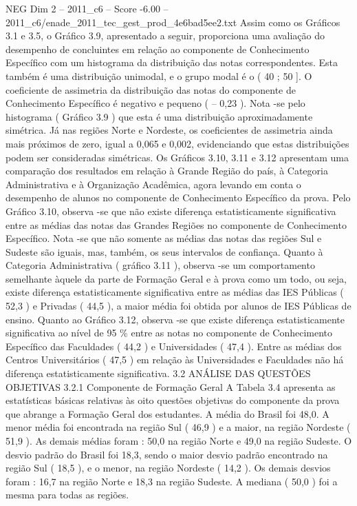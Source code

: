 \begin{textsample}{NEG Dim 2 – 2011\_c6 – Score -6.00 – 2011\_c6/enade\_2011\_tec\_gest\_prod\_4e6bad5ee2.txt}
Assim como os Gráficos 3.1 e 3.5, o Gráfico 3.9, apresentado a seguir, proporciona uma avaliação do desempenho de concluintes em relação ao componente de Conhecimento Específico com um histograma da distribuição das notas correspondentes.
Esta também é uma distribuição unimodal, e o grupo modal é o ( 40 ; 50 ].
O coeficiente de assimetria da distribuição das notas do componente de Conhecimento Específico é negativo e pequeno ( – 0,23 ).
Nota -se pelo histograma ( Gráfico 3.9 ) que esta é uma distribuição aproximadamente simétrica.
Já nas regiões Norte e Nordeste, os coeficientes de assimetria ainda mais próximos de zero, igual a 0,065 e 0,002, evidenciando que estas distribuições podem ser consideradas simétricas.
Os Gráficos 3.10, 3.11 e 3.12 apresentam uma comparação dos resultados em relação à Grande Região do país, à Categoria Administrativa e à Organização Acadêmica, agora levando em conta o desempenho de alunos no componente de Conhecimento Específico da prova.
Pelo Gráfico 3.10, observa -se que não existe diferença estatisticamente significativa entre as médias das notas das Grandes Regiões no componente de Conhecimento Específico.
Nota -se que não somente as médias das notas das regiões Sul e Sudeste são iguais, mas, também, os seus intervalos de confiança.
Quanto à Categoria Administrativa ( gráfico 3.11 ), observa -se um comportamento semelhante àquele da parte de Formação Geral e à prova como um todo, ou seja, existe diferença estatisticamente significativa entre as médias das IES Públicas ( 52,3 ) e Privadas ( 44,5 ), a maior média foi obtida por alunos de IES Públicas de ensino.
Quanto ao Gráfico 3.12, observa -se que existe diferença estatisticamente significativa ao nível de 95 \% entre as notas no componente de Conhecimento Específico das Faculdades ( 44,2 ) e Universidades ( 47,4 ).
Entre as médias dos Centros Universitários ( 47,5 ) em relação às Universidades e Faculdades não há diferença estatisticamente significativa. 3.2 ANÁLISE DAS QUESTÕES OBJETIVAS 3.2.1 Componente de Formação Geral A Tabela 3.4 apresenta as estatísticas básicas relativas às oito questões objetivas do componente da prova que abrange a Formação Geral dos estudantes.
A média do Brasil foi 48,0.
A menor média foi encontrada na região Sul ( 46,9 ) e a maior, na região Nordeste ( 51,9 ).
As demais médias foram : 50,0 na região Norte e 49,0 na região Sudeste.
O desvio padrão do Brasil foi 18,3, sendo o maior desvio padrão encontrado na região Sul ( 18,5 ), e o menor, na região Nordeste ( 14,2 ).
Os demais desvios foram : 16,7 na região Norte e 18,3 na região Sudeste.
A mediana ( 50,0 ) foi a mesma para todas as regiões.

\end{textsample}
